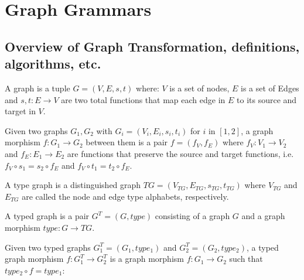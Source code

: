 \chapter{Graph Grammars}

\section{Overview of Graph Transformation, definitions, algorithms, etc.}

\begin{definition}[Graph] A graph is a tuple $G = \left(V,E,s,t\right)$ where: $V$ is a set of nodes, $E$ is a set of Edges and $s,t : E \rightarrow V$ are two total functions that map each edge in $E$ to its source and target in $V$.

\end{definition}

\begin{example}[Graph]
\end{example}

\begin{definition} Given two graphs $G_1,G_2$ with $G_i = \left(V_i, E_i, s_i, t_i\right)$ for $i$ in $[1,2]$, a graph morphism $f : G_1 \rightarrow G_2$ between them is a pair $f = \left(f_V,f_E\right)$ where $f_V : V_1 \rightarrow V_2$ and $f_E : E_1 \rightarrow E_2$ are functions that preserve the source and target functions, i.e. $f_V \circ s_1 = s_2 \circ f_E$ and $f_V \circ t_1 = t_2 \circ f_E$.  
\end{definition}

\begin{definition} A type graph is a distinguished graph $TG = \left(V_{TG},E_{TG},s_{TG},t_{TG}\right)$ where $V_{TG}$ and $E_{TG}$ are called the node and edge type alphabets, respectively.

  A typed graph is a pair $G^T = \left(G, type\right)$ consisting of a graph $G$ and a graph morphism $type : G \rightarrow TG$.

  Given two typed graphs $G^T_1 = \left(G_1,type_1\right)$ and $G^T_2 =\left(G_2,type_2\right)$, a typed graph morphism $f : G^T_1 \rightarrow G^T_2$ is a graph morphism $f : G_1 \rightarrow G_2$ such that $type_2 \circ f = type_1$:

\end{definition}

